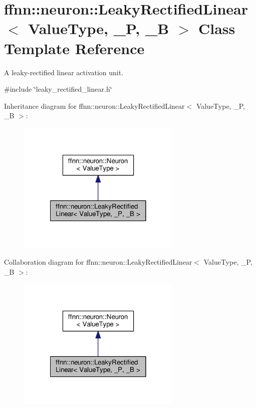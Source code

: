\hypertarget{classffnn_1_1neuron_1_1_leaky_rectified_linear}{\section{ffnn\-:\-:neuron\-:\-:Leaky\-Rectified\-Linear$<$ Value\-Type, \-\_\-\-P, \-\_\-\-B $>$ Class Template Reference}
\label{classffnn_1_1neuron_1_1_leaky_rectified_linear}
}


A leaky-\/rectified linear activation unit.  




{\ttfamily \#include \char`\"{}leaky\-\_\-rectified\-\_\-linear.\-h\char`\"{}}



Inheritance diagram for ffnn\-:\-:neuron\-:\-:Leaky\-Rectified\-Linear$<$ Value\-Type, \-\_\-\-P, \-\_\-\-B $>$\-:\nopagebreak
\begin{figure}[H]
\begin{center}
\leavevmode
\includegraphics[width=222pt]{classffnn_1_1neuron_1_1_leaky_rectified_linear__inherit__graph}
\end{center}
\end{figure}


Collaboration diagram for ffnn\-:\-:neuron\-:\-:Leaky\-Rectified\-Linear$<$ Value\-Type, \-\_\-\-P, \-\_\-\-B $>$\-:\nopagebreak
\begin{figure}[H]
\begin{center}
\leavevmode
\includegraphics[width=222pt]{classffnn_1_1neuron_1_1_leaky_rectified_linear__coll__graph}
\end{center}
\end{figure}
